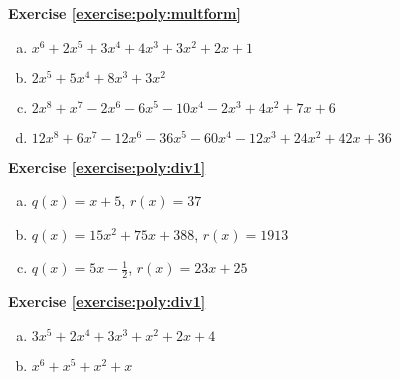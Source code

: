 \noindent\textbf{Exercise \ref{exercise:poly:multform}}
\begin{enumerate} [(a)]
\item 
 $x^6+2x^5+3x^4+4x^3+3x^2+2x+1$
\item
 $2x^5+5x^4+8x^3+3x^2$
\item
$2x^8+x^7-2x^6-6x^5-10x^4-2x^3+4x^2+7x+6$
\item
$12x^8+6x^7-12x^6-36x^5-60x^4-12x^3+24x^2+42x+36$
\end {enumerate}

\noindent\textbf{Exercise \ref{exercise:poly:div1}}
\begin{enumerate} [(a)]
\item 
 $q(x)=x+5$, $r(x)=37$
\item
 $q(x)=15x^2+75x+388$, $r(x)=1913$
\item
$q(x)=5x-\frac{1}{2}$, $r(x)=23x+25$
\end {enumerate}

\noindent\textbf{Exercise \ref{exercise:poly:div1}}
\begin{enumerate} [(a)]
\item
$3x^5 + 2x^4 + 3x^3 + x^2 +2x +4$
\item
$x^6 + x^5 + x^2 + x$
\end {enumerate}



%
%
%

